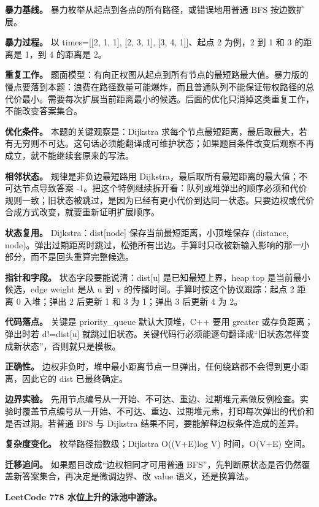 \textbf{暴力基线。} 暴力枚举从起点到各点的所有路径，或错误地用普通 BFS 按边数扩展。

\textbf{暴力过程。} 以 times=[[2, 1, 1], [2, 3, 1], [3, 4, 1]]、起点 2 为例，2 到 1 和 3 的距离是 1，到 4 的距离是 2。

\textbf{重复工作。} 题面模型：有向正权图从起点到所有节点的最短路最大值。暴力版的慢点要落到本题：浪费在路径数量可能爆炸，而且普通队列不能保证带权路径的总代价最小。需要每次扩展当前距离最小的候选。后面的优化只消掉这类重复工作，不能改变答案集合。

\textbf{优化条件。} 本题的关键观察是：Dijkstra 求每个节点最短距离，最后取最大，若有无穷则不可达。这句话必须能翻译成可维护状态；如果题目条件改变后观察不再成立，就不能继续套原来的写法。

\textbf{相邻状态。} 规律是非负边最短路用 Dijkstra，最后取所有最短距离的最大值；不可达节点导致答案 -1。把这个特例继续拆开看：队列或堆弹出的顺序必须和代价规则一致；旧状态被跳过，是因为已经有更小代价到达同一状态。只要边权或代价合成方式改变，就要重新证明扩展顺序。

\textbf{状态复用。} Dijkstra：dist[node] 保存当前最短距离，小顶堆保存 (distance, node)。弹出过期距离时跳过，松弛所有出边。手算时只改被新输入影响的那一小部分，而不是回头重算完整候选。

\textbf{指针和字段。} 状态字段要能说清：dist[u] 是已知最短上界，heap top 是当前最小候选，edge weight 是从 u 到 v 的传播时间。手算时按这个协议跟踪：起点 2 距离 0 入堆；弹出 2 后更新 1 和 3 为 1；弹出 3 后更新 4 为 2。

\textbf{代码落点。} 关键是 priority\_queue 默认大顶堆，C++ 要用 greater 或存负距离；弹出时若 d!=dist[u] 就跳过旧状态。关键代码行必须能逐句翻译成“旧状态怎样变成新状态”，否则就只是模板。

\textbf{正确性。} 边权非负时，堆中最小距离节点一旦弹出，任何绕路都不会得到更小距离，因此它的 dist 已最终确定。

\textbf{边界实验。} 先用节点编号从一开始、不可达、重边、过期堆元素做反例检查。实验时覆盖节点编号从一开始、不可达、重边、过期堆元素，打印每次弹出的代价和是否过期。若普通 BFS 与 Dijkstra 结果不同，要能解释边权条件造成的差异。

\textbf{复杂度变化。} 枚举路径指数级；Dijkstra O((V+E)log V) 时间，O(V+E) 空间。

\textbf{迁移追问。} 如果题目改成“边权相同才可用普通 BFS”，先判断原状态是否仍然覆盖新答案集合，再决定是微调边界、改 value 语义，还是换算法。

\noindent\textbf{LeetCode 778 水位上升的泳池中游泳。}

